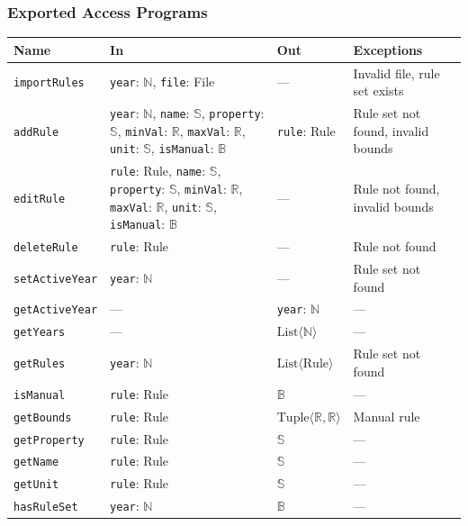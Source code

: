 \documentclass[12pt, titlepage]{article}
\begin{document}
\subsubsection{Exported Access Programs}
\begin{tabularx}{\textwidth}{p{2.7cm} p{6.3cm} p{2.6cm} X}
\toprule
\textbf{Name} & \textbf{In} & \textbf{Out} & \textbf{Exceptions} \\
\midrule
\texttt{importRules} & \texttt{year}: $\mathbb{N}$, \texttt{file}: File & --- & Invalid file, rule set exists \\
\texttt{addRule} & \texttt{year}: $\mathbb{N}$, \texttt{name}: $\mathbb{S}$, \texttt{property}: $\mathbb{S}$, \texttt{minVal}: $\mathbb{R}$, \texttt{maxVal}: $\mathbb{R}$, \texttt{unit}: $\mathbb{S}$, \texttt{isManual}: $\mathbb{B}$ & \texttt{rule}: Rule & Rule set not found, invalid bounds \\
\texttt{editRule} & \texttt{rule}: Rule, \texttt{name}: $\mathbb{S}$, \texttt{property}: $\mathbb{S}$, \texttt{minVal}: $\mathbb{R}$, \texttt{maxVal}: $\mathbb{R}$, \texttt{unit}: $\mathbb{S}$, \texttt{isManual}: $\mathbb{B}$ & --- & Rule not found, invalid bounds \\
\texttt{deleteRule} & \texttt{rule}: Rule & --- & Rule not found \\
\texttt{setActiveYear} & \texttt{year}: $\mathbb{N}$ & --- & Rule set not found \\
\texttt{getActiveYear} & --- & \texttt{year}: $\mathbb{N}$ & --- \\
\texttt{getYears} & --- & $\text{List}\langle \mathbb{N} \rangle$ & --- \\
\texttt{getRules} & \texttt{year}: $\mathbb{N}$ & $\text{List}\langle \text{Rule} \rangle$ & Rule set not found \\
\texttt{isManual} & \texttt{rule}: Rule & $\mathbb{B}$ & --- \\
\texttt{getBounds} & \texttt{rule}: Rule & $\text{Tuple}\langle \mathbb{R}, \mathbb{R} \rangle$ & Manual rule \\
\texttt{getProperty} & \texttt{rule}: Rule & $\mathbb{S}$ & --- \\
\texttt{getName} & \texttt{rule}: Rule & $\mathbb{S}$ & --- \\
\texttt{getUnit} & \texttt{rule}: Rule & $\mathbb{S}$ & --- \\
\texttt{hasRuleSet} & \texttt{year}: $\mathbb{N}$ & $\mathbb{B}$ & --- \\
\bottomrule
\end{tabularx}
\end{document}
